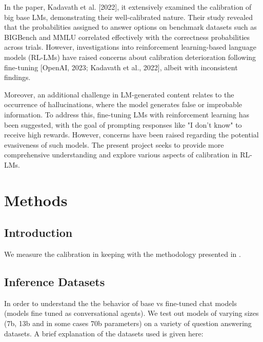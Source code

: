 \documentclass[11pt]{article}
\begin{document}
In the paper, Kadavath et al. [2022], it extensively examined the calibration of big base LMs, demonstrating their well-calibrated nature. Their study revealed that the probabilities assigned to answer options on benchmark datasets such as BIGBench and MMLU correlated effectively with the correctness probabilities across trials. However, investigations into reinforcement learning-based language models (RL-LMs) have raised concerns about calibration deterioration following fine-tuning [OpenAI, 2023; Kadavath et al., 2022], albeit with inconsistent findings.

Moreover, an additional challenge in LM-generated content relates to the occurrence of hallucinations, where the model generates false or improbable information. To address this, fine-tuning LMs with reinforcement learning has been suggested, with the goal of prompting responses like "I don't know" to receive high rewards. However, concerns have been raised regarding the potential evasiveness of such models. The present project seeks to provide more comprehensive understanding and explore various aspects of calibration in RL-LMs.



\section{Methods}


\subsection{Introduction}

We measure the calibration in keeping with the methodology 
presented in \cite{kadavath2022language}. 

\subsection{Inference Datasets}

In order to understand the the behavior of base vs fine-tuned chat models 
(models fine tuned as conversational agents). We test out models of varying sizes 
(7b, 13b and in some cases 70b parameters) on a variety of question answering datasets. 
A brief explanation of the datasets used is given here:
\end{document}
